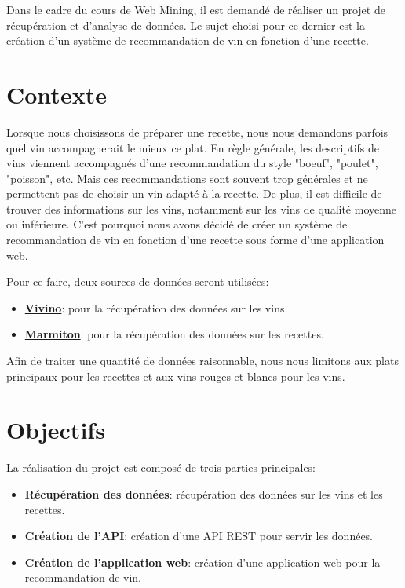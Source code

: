 Dans le cadre du cours de Web Mining, il est demandé de réaliser un projet de récupération et d'analyse de données.
Le sujet choisi pour ce dernier est la création d'un système de recommandation de vin en fonction d'une recette.


\section{Contexte}
Lorsque nous choisissons de préparer une recette, nous nous demandons parfois quel vin accompagnerait le mieux ce plat. 
En règle générale, les descriptifs de vins viennent accompagnés d'une recommandation du style "boeuf", "poulet", "poisson", etc.
Mais ces recommandations sont souvent trop générales et ne permettent pas de choisir un vin adapté à la recette. 
De plus, il est difficile de trouver des informations sur les vins, notamment sur les vins de qualité moyenne ou inférieure. 
C'est pourquoi nous avons décidé de créer un système de recommandation de vin en fonction d'une recette sous forme d'une application web.

Pour ce faire, deux sources de données seront utilisées:
\begin{itemize}
    \item \href{https://www.vivino.com/}{\textbf{Vivino}}: pour la récupération des données sur les vins.
    \item \href{https://www.marmiton.org/recettes/index/categorie/plat-principal/}{\textbf{Marmiton}}: pour la récupération des données sur les recettes.
\end{itemize}

Afin de traiter une quantité de données raisonnable, nous nous limitons aux plats principaux pour les recettes et aux vins rouges et blancs pour les vins.

\section{Objectifs}
La réalisation du projet est composé de trois parties principales:
\begin{itemize}
    \item \textbf{Récupération des données}: récupération des données sur les vins et les recettes.
    \item \textbf{Création de l'API}: création d'une API REST pour servir les données.
    \item \textbf{Création de l'application web}: création d'une application web pour la recommandation de vin.
\end{itemize}